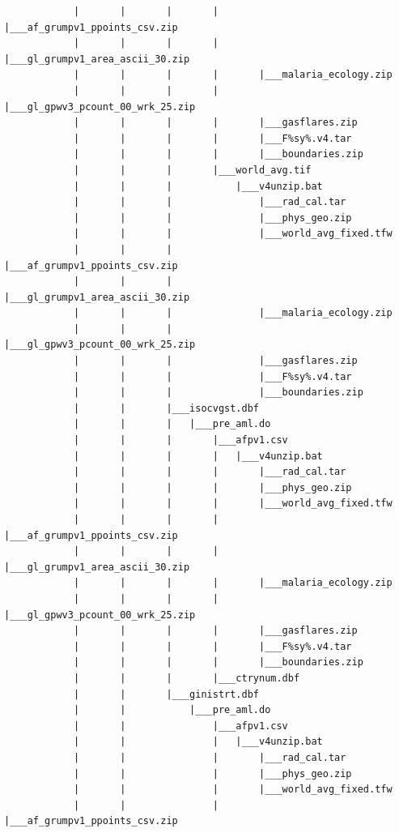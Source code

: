 \documentclass[
]{book}
\begin{document}
\begin{verbatim}
            |       |       |       |       |___af_grumpv1_ppoints_csv.zip
            |       |       |       |       |___gl_grumpv1_area_ascii_30.zip
            |       |       |       |       |___malaria_ecology.zip
            |       |       |       |       |___gl_gpwv3_pcount_00_wrk_25.zip
            |       |       |       |       |___gasflares.zip
            |       |       |       |       |___F%sy%.v4.tar
            |       |       |       |       |___boundaries.zip
            |       |       |       |___world_avg.tif
            |       |       |           |___v4unzip.bat
            |       |       |               |___rad_cal.tar
            |       |       |               |___phys_geo.zip
            |       |       |               |___world_avg_fixed.tfw
            |       |       |               |___af_grumpv1_ppoints_csv.zip
            |       |       |               |___gl_grumpv1_area_ascii_30.zip
            |       |       |               |___malaria_ecology.zip
            |       |       |               |___gl_gpwv3_pcount_00_wrk_25.zip
            |       |       |               |___gasflares.zip
            |       |       |               |___F%sy%.v4.tar
            |       |       |               |___boundaries.zip
            |       |       |___isocvgst.dbf
            |       |       |   |___pre_aml.do
            |       |       |       |___afpv1.csv
            |       |       |       |   |___v4unzip.bat
            |       |       |       |       |___rad_cal.tar
            |       |       |       |       |___phys_geo.zip
            |       |       |       |       |___world_avg_fixed.tfw
            |       |       |       |       |___af_grumpv1_ppoints_csv.zip
            |       |       |       |       |___gl_grumpv1_area_ascii_30.zip
            |       |       |       |       |___malaria_ecology.zip
            |       |       |       |       |___gl_gpwv3_pcount_00_wrk_25.zip
            |       |       |       |       |___gasflares.zip
            |       |       |       |       |___F%sy%.v4.tar
            |       |       |       |       |___boundaries.zip
            |       |       |       |___ctrynum.dbf
            |       |       |___ginistrt.dbf
            |       |           |___pre_aml.do
            |       |               |___afpv1.csv
            |       |               |   |___v4unzip.bat
            |       |               |       |___rad_cal.tar
            |       |               |       |___phys_geo.zip
            |       |               |       |___world_avg_fixed.tfw
            |       |               |       |___af_grumpv1_ppoints_csv.zip

\end{verbatim}
\end{document}
